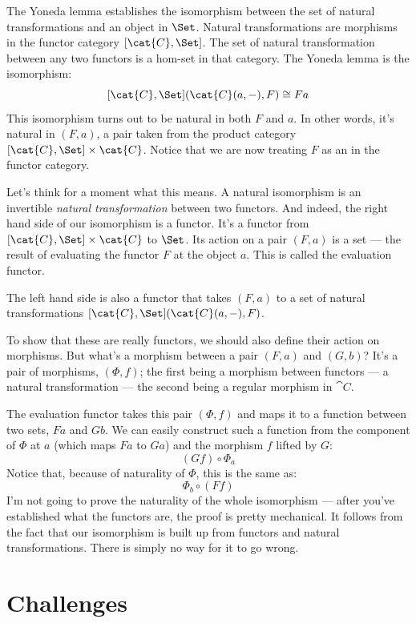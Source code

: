 The Yoneda lemma establishes the isomorphism between the set of natural
transformations and an object in $\Set$. Natural transformations
are morphisms in the functor category $[\cat{C}, \Set]$. The set of
natural transformation between any two functors is a hom-set in that
category. The Yoneda lemma is the isomorphism:
\[[\cat{C}, \Set](\cat{C}(a, -), F) \cong F a\]
This isomorphism turns out to be natural in both $F$ and
$a$. In other words, it's natural in $(F, a)$, a pair
taken from the product category  $[\cat{C}, \Set] \times \cat{C}$. Notice
that we are now treating $F$ as an  in the functor
category.

Let's think for a moment what this means. A natural isomorphism is an
invertible \emph{natural transformation} between two functors. And
indeed, the right hand side of our isomorphism is a functor. It's a
functor from $[\cat{C}, \Set] \times \cat{C}$ to $\Set$. Its action on
a pair $(F, a)$ is a set --- the result of evaluating the
functor $F$ at the object $a$. This is called the
evaluation functor.

The left hand side is also a functor that takes $(F, a)$ to a
set of natural transformations $[\cat{C}, \Set](\cat{C}(a, -), F)$.

To show that these are really functors, we should also define their
action on morphisms. But what's a morphism between a pair
$(F, a)$ and $(G, b)$? It's a pair of morphisms,
$(\Phi, f)$; the first being a morphism between functors --- a
natural transformation --- the second being a regular morphism in
$\cat{C}$.

The evaluation functor takes this pair $(\Phi, f)$ and maps it to a
function between two sets, $F a$ and $G b$. We can
easily construct such a function from the component of $\Phi$ at
$a$ (which maps $F a$ to $G a$) and the morphism
$f$ lifted by $G$:
\[(G f) \circ \Phi_a\]
Notice that, because of naturality of $\Phi$, this is the same as:
\[\Phi_b \circ (F f)\]
I'm not going to prove the naturality of the whole isomorphism --- after
you've established what the functors are, the proof is pretty
mechanical. It follows from the fact that our isomorphism is built up
from functors and natural transformations. There is simply no way for it
to go wrong.

\section{Challenges}

